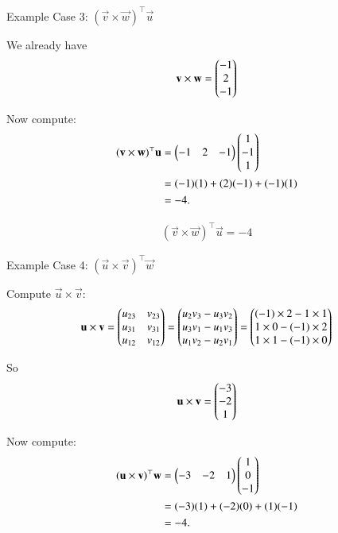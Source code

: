 \documentclass{beamer}
\begin{document}
\begin{frame}{Example}
    Case 3: $(\vec{v} \times \vec{w}) ^\top \vec{u}$

We already have
\begin{align}
\mathbf{v}\times \mathbf{w} = \begin{pmatrix}-1 \\ 2 \\ -1\end{pmatrix}
\end{align}

Now compute:
\begin{align}
(\mathbf{v}\times \mathbf{w})^\top \mathbf{u} &= \begin{pmatrix}-1 & 2 & -1\end{pmatrix}\begin{pmatrix}1 \\ -1 \\ 1\end{pmatrix} \\
&= (-1)(1) + (2)(-1) + (-1)(1) \\
&= -4.
\end{align}

\begin{align}
\boxed{(\vec{v}\times \vec{w})^\top \vec{u} = -4}
\end{align}
\end{frame}

\begin{frame}{Example}
    Case 4: $(\vec{u} \times \vec{v})^\top \vec{w}$

Compute $\vec{u} \times \vec{v}$:
\begin{align}
\mathbf{u} \times \mathbf{v} =
\begin{pmatrix}
u_{23} & v_{23} \\
u_{31} & v_{31} \\
u_{12} & v_{12}
\end{pmatrix}
=
\begin{pmatrix}
u_2 v_3 - u_3 v_2 \\
u_3 v_1 - u_1 v_3 \\
u_1 v_2 - u_2 v_1
\end{pmatrix}
=
\begin{pmatrix}
(-1) \times 2 - 1 \times 1 \\
1 \times 0 - (-1) \times 2 \\
1 \times 1 - (-1) \times 0
\end{pmatrix}
\end{align}

So
\begin{align}
\mathbf{u}\times \mathbf{v} =\begin{pmatrix}-3 \\ -2 \\ 1\end{pmatrix}
\end{align}

Now compute:
\begin{align}
(\mathbf{u}\times \mathbf{v})^\top \mathbf{w} &= \begin{pmatrix}-3 & -2 & 1\end{pmatrix}\begin{pmatrix}1 \\ 0 \\ -1\end{pmatrix} \\
&= (-3)(1) + (-2)(0) + (1)(-1) \\
&= -4.
\end{align}
\end{frame}
\end{document}
